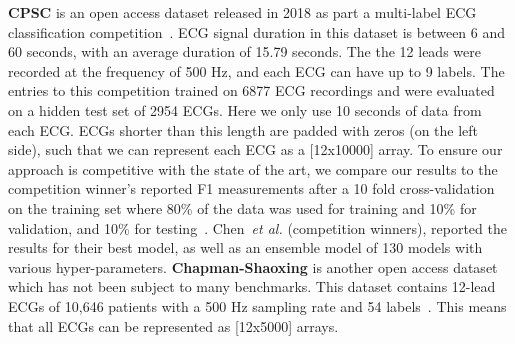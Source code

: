 \documentclass{article}
\begin{document}
\textbf{CPSC} is an open access  dataset released in 2018 as part a multi-label ECG classification competition~\cite{liu2018open}. ECG signal duration in this dataset is between 6 and 60 seconds, with an average duration of 15.79 seconds. The the 12 leads were recorded at the frequency of 500 Hz, and each ECG can have up to 9 labels. The entries to this competition trained on 6877 ECG recordings and were evaluated on a hidden test set of 2954 ECGs. Here we only use 10 seconds of data from each ECG. ECGs shorter than this length are padded with zeros (on the left side), such that we can represent each ECG as a [12x10000] array. To ensure our approach is competitive with the state of the art, we compare our results to the competition winner's reported F1 measurements after a 10 fold cross-validation on the training set where 80\% of the data was used for training and 10\% for validation, and 10\% for testing~\cite{chen2020detection}. Chen~\textit{et al.} (competition winners), reported the results for their best model, as well as an ensemble model of 130 models with various hyper-parameters. \textbf{Chapman-Shaoxing} is another open access dataset which has not been subject to many benchmarks. This dataset contains 12-lead ECGs of 10,646 patients with a 500 Hz sampling rate and 54 labels~\cite{zheng202012}. This means that all ECGs can be represented as [12x5000] arrays.  

\end{document}
